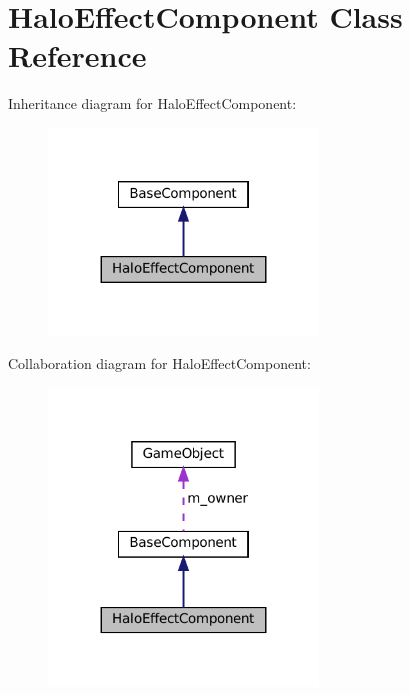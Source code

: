\hypertarget{classHaloEffectComponent}{}\section{Halo\+Effect\+Component Class Reference}
\label{classHaloEffectComponent}


Inheritance diagram for Halo\+Effect\+Component\+:
\nopagebreak
\begin{figure}[H]
\begin{center}
\leavevmode
\includegraphics[width=203pt]{classHaloEffectComponent__inherit__graph}
\end{center}
\end{figure}


Collaboration diagram for Halo\+Effect\+Component\+:
\nopagebreak
\begin{figure}[H]
\begin{center}
\leavevmode
\includegraphics[width=203pt]{classHaloEffectComponent__coll__graph}
\end{center}
\end{figure}
